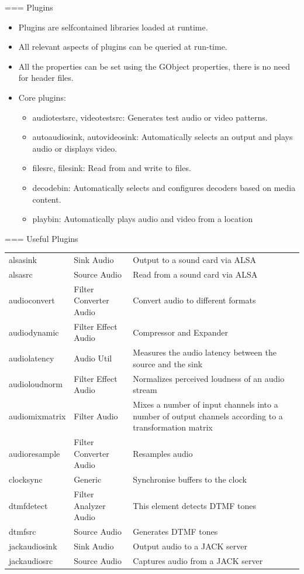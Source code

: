 === {Plugins}
  \begin{itemize}
  \item Plugins are selfcontained libraries loaded at runtime.
  \item All relevant aspects of plugins can be queried at run-time.
  \item All the properties can be set using the GObject properties, there is no need for header files.
  \item Core plugins:
    \begin{itemize}
    \item audiotestsrc, videotestsrc: Generates test audio or video
      patterns.
    \item autoaudiosink, autovideosink: Automatically selects an
      output and plays audio or displays video.
    \item filesrc, filesink: Read from and write to files.
    \item decodebin: Automatically selects and configures decoders
      based on media content.
    \item playbin: Automatically plays audio and video from a location
    \end{itemize}
  \end{itemize}


=== {Useful Plugins}
  \begin{center}
  \fontsize{8}{9}\selectfont
  \begin{tabularx}{13cm}{l|l|X}
    alsasink & Sink Audio & Output to a sound card via ALSA \\
    alsasrc & Source Audio & Read from a sound card via ALSA \\
    audioconvert & Filter Converter Audio & Convert audio to different formats \\
    audiodynamic & Filter Effect Audio & Compressor and Expander \\
    audiolatency & Audio Util & Measures the audio latency between the source and the sink \\
    audioloudnorm & Filter Effect Audio & Normalizes perceived loudness of an audio stream \\
    audiomixmatrix & Filter Audio & Mixes a number of input channels
    into a number of output channels according to a transformation
    matrix \\
    audioresample & Filter Converter Audio & Resamples audio \\
    clocksync & Generic &Synchronise buffers to the clock \\
    dtmfdetect & Filter Analyzer Audio & This element detects DTMF tones \\
    dtmfsrc & Source Audio & Generates DTMF tones \\
    jackaudiosink & Sink Audio & Output audio to a JACK server \\
    jackaudiosrc & Source Audio & Captures audio from a JACK server \\
  \end{tabularx}
  \end{center}


